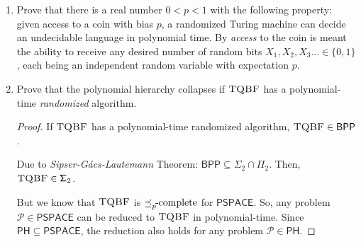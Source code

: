 \documentclass[usletter]{article}
\newcommand {\langset}[1]      {\ensuremath{\mathcal{#1}}}
\newcommand {\machine}[1]      {\ensuremath{\mathscr{#1}}}
\newcommand {\namedlangset}[1] {\ensuremath{\textnormal{\textsc{#1}}}}
\newcommand {\family}[1]       {\ensuremath{\mathsf{#1}}}
\newcommand {\term}[1]      {\textit{#1}}
\newcommand {\namethm}[1]   {\term{#1} Theorem}
\newcommand {\reduce}[2]    {\ensuremath{\preceq_{#1}^{#2}}}
\newcommand {\complete}[2]  {\ensuremath{\reduce{#1}{#2}     %
                                         \hspace*{-4pt}\textnormal{-complete}}}
\newcommand {\PH}     {\family{PH}}
\newcommand {\NP}     {\family{NP}}
\newcommand {\RP}     {\family{RP}}
\newcommand {\BPP}    {\family{BPP}}
\newcommand {\PSPACE} {\family{PSPACE}}
\newcommand {\FPi}    {\family{\Pi}}
\newcommand {\FSigma} {\family{\Sigma}}
\begin{document}
\begin{enumerate}[labelsep=2.5em, label=\textbf{\arabic{enumi}}]
\begin{proof}
    As \machine{R} now has a false-negative rate $\leq \frac{n}{3^k} \leq
    \frac{n}{3n} = \frac{1}{3}$; it establishes that
    $\namedlangset{SAT} \in \RP$; starting with the assumption that
    $\namedlangset{SAT} \in \BPP$. \\
    And since $\namedlangset{SAT} \in \RP$, we would have the same for any
    \NP-complete problem.
  \end{proof}
  \begin{remark}
    The above proof implies : $\NP \subseteq \RP$. But in fact $\NP = \RP$! \\
    This is because $\RP \subseteq \NP$, as discussed in class -- a problem
    being in \RP, shows that it has at least \textit{exponentially} many
    certificates; which is a subset of problems with at least \textit{one}
    certificate (\NP).
  \end{remark}


  \item Prove that there is a real number $0 < p < 1$ with the following
        property: given access to a coin with bias $p$, a randomized Turing
        machine can decide an undecidable language in polynomial time. By
        \textit{access} to the coin is meant the ability to receive any desired
        number of random bits $X_1, X_2, X_3 ... \in \{0,1\}$, each being an
        independent random variable with expectation $p$.


  \item Prove that the polynomial hierarchy collapses if \namedlangset{TQBF} has
        a polynomial-time \textit{randomized} algorithm.
  \begin{proof}
    If \namedlangset{TQBF} has a polynomial-time randomized algorithm,
    $\namedlangset{TQBF} \in \BPP$.

    Due to \namethm{Sipser-G\'{a}cs-Lautemann}\cite{Lautemann1983}:
    $\BPP \subseteq \FSigma_2 \cap \FPi_2$.
    Then, $\namedlangset{TQBF} \in \FSigma_2$.

    But we know that \namedlangset{TQBF} is \complete{p}{} for \PSPACE. So, any
    problem $\langset{P} \in \PSPACE$ can be reduced to \namedlangset{TQBF} in
    polynomial-time. Since $\PH \subseteq \PSPACE$, the reduction also holds for
    any problem $\langset{P} \in \PH$.


\end{proof}
\end{enumerate}
\end{document}
